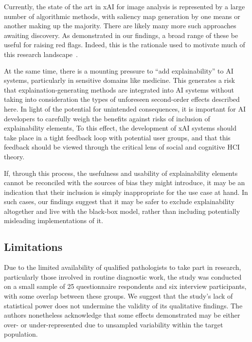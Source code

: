 Currently, the state of the art in xAI for image analysis is represented by a large number of algorithmic methods, with saliency map generation by one means or another making up the majority. There are likely many more such approaches awaiting discovery. As demonstrated in our findings, a broad range of these be useful for raising red flags. Indeed, this is the rationale used to motivate much of this research landscape~\cite{ribeiro2016trust}. 

At the same time, there is a mounting pressure to ``add explainability'' to AI systems, particularly in sensitive domains like medicine. This generates a risk that explaination-generating methods are integrated into AI systems without taking into consideration the types of unforeseen second-order effects described here. In light of the potential for unintended consequences, it is important for AI developers to carefully weigh the benefits against risks of inclusion of explainability elements, To this effect, the development of xAI systems should take place in a tight feedback loop with potential user groups, and that this feedback should be viewed through the critical lens of social and cognitive HCI theory. 

If, through this process, the usefulness and usability of explainability elements cannot be reconciled with the sources of bias they might introduce, it may be an indication that their inclusion is simply inappropriate for the use case at hand. In such cases, our findings suggest that it may be safer to exclude explainability altogether and live with the black-box model, rather than including potentially misleading implementations of it.

\subsection{Limitations}

Due to the limited availability of qualified pathologists to take part in research, particularly those involved in routine diagnostic work, the study was conducted on a small sample of 25 questionnaire respondents and six interview participants, with some overlap between these groups. We suggest that the study's lack of statistical power does not undermine the validity of its qualitative findings. The authors nonetheless acknowledge that some effects demonstrated may be either over- or under-represented due to unsampled variability within the target population. 

